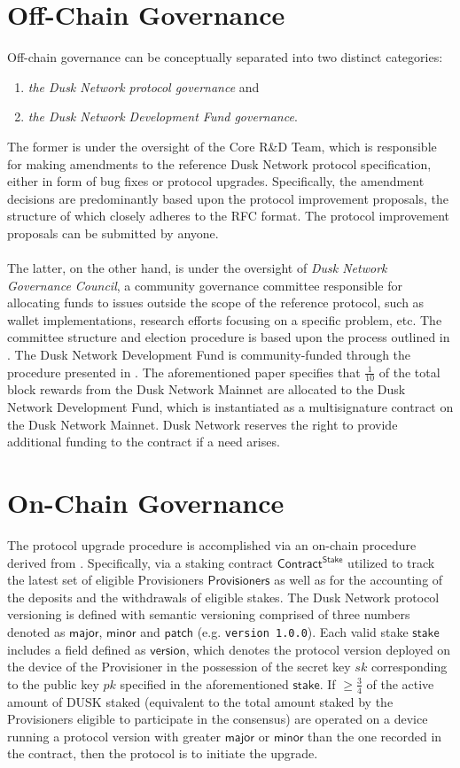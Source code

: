 \documentclass{article}
\begin{document}
\section{Off-Chain Governance}
Off-chain governance can be conceptually separated into two distinct categories:
\begin{enumerate}
    \item \emph{the Dusk Network protocol governance} and
    \item \emph{the Dusk Network Development Fund governance}.
\end{enumerate}
The former is under the oversight of the Core R\&D Team, which is responsible for making amendments to the reference Dusk Network protocol specification, either in form of bug fixes or protocol upgrades. Specifically, the amendment decisions are predominantly based upon the protocol improvement proposals, the structure of which closely adheres to the RFC\cite{ietf} format. The protocol improvement proposals can be submitted by anyone.\\\\
The latter, on the other hand, is under the oversight of \emph{Dusk Network Governance Council}, a community governance committee responsible for allocating funds to issues outside the scope of the reference protocol, such as wallet implementations, research efforts focusing on a specific problem, etc. The committee structure and election procedure is based upon the process outlined in \cite{zcash}. The Dusk Network Development Fund is community-funded through the procedure presented in \cite{maharramov}. The aforementioned paper specifies that $\frac{1}{10}$ of the total block rewards from the Dusk Network Mainnet are allocated to the Dusk Network Development Fund, which is instantiated as a multisignature contract on the Dusk Network Mainnet. Dusk Network reserves the right to provide additional funding to the contract if a need arises.
\section{On-Chain Governance}
The protocol upgrade procedure is accomplished via an on-chain procedure derived from \cite{goodman}. Specifically, via a staking contract $\mathsf{Contract^{Stake}}$ utilized to track the latest set of eligible Provisioners $\mathsf{Provisioners}$ as well as for the accounting of the deposits and the withdrawals of eligible stakes. The Dusk Network protocol versioning is defined with semantic versioning \cite{preston-werner} comprised of three numbers denoted as $\mathsf{major}$, $\mathsf{minor}$ and $\mathsf{patch}$ (e.g. \texttt{version 1.0.0}). Each valid stake $\mathsf{stake}$ includes a field defined as $\mathsf{version}$, which denotes the protocol version deployed on the device of the Provisioner in the possession of the secret key $sk$ corresponding to the public key $pk$ specified in the aforementioned $\mathsf{stake}$. If $\geq \frac{3}{4}$ of the active amount of DUSK staked (equivalent to the total amount staked by the Provisioners eligible to participate in the consensus) are operated on a device running a protocol version with greater $\mathsf{major}$ or $\mathsf{minor}$ than the one recorded in the contract, then the protocol is to initiate the upgrade.
\end{document}
